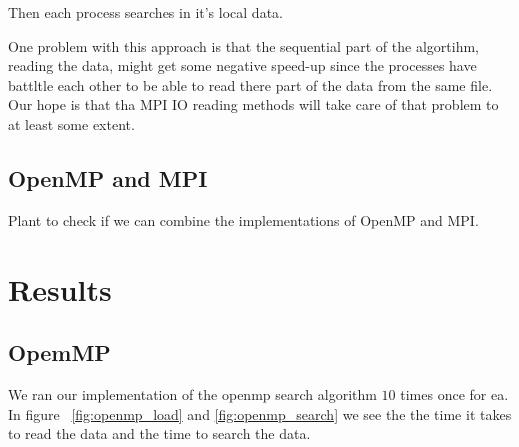 \documentclass[a4paper,10pt]{article}
\begin{document}
  Then each process searches in it's local data.

  One problem with this approach is that the sequential part of the algortihm, reading the data,
  might get some negative speed-up since the processes have battltle each other 
  to be able to read there part of the data from the same file.  Our hope is that
  tha MPI IO reading methods will take care of that problem to at least some extent.   
  

\subsection{OpenMP and MPI}
  Plant to check if we can combine the implementations of OpenMP and MPI.



\section{Results}

\subsection{OpemMP}
 
 We ran our implementation of the openmp search algorithm $10$ times 
 once for ea.
 In figure ~\ref{fig:openmp_load} and \ref{fig:openmp_search} we see the
 the time it takes to read the data and the time to search the data.
 
\end{document}
